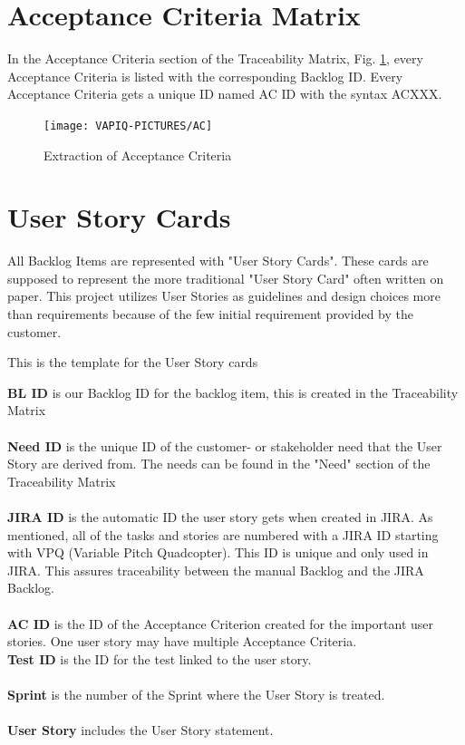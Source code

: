 \newpage

\section{Acceptance Criteria Matrix}
In the Acceptance Criteria section of the Traceability Matrix, Fig. \ref{fig:acm}, every Acceptance Criteria is listed with the corresponding Backlog ID. Every Acceptance Criteria gets a unique ID named AC ID with the syntax ACXXX. 
\begin{figure}[h]
    \centering
        \texttt{[image: VAPIQ-PICTURES/AC]}
    \caption{Extraction of Acceptance Criteria}
    \label{fig:acm}
\end{figure}

\newpage

\section{User Story Cards}
All Backlog Items are represented with "User Story Cards". These cards are supposed to represent the more traditional "User Story Card" often written on paper. This project utilizes User Stories as guidelines and design choices more than requirements because of the few initial requirement provided by the customer. \bigskip

This is the template for the User Story cards 

\krav{}{}{}{}{}{}{}


\textbf{BL ID} is our Backlog ID for the backlog item, this is created in the Traceability Matrix \\ \\
\textbf{Need ID} is the unique ID of the customer- or stakeholder need that the User Story are derived from. The needs can be found in the "Need" section of the Traceability Matrix \\ \\
\textbf{JIRA ID} is the automatic ID the user story gets when created in JIRA. As mentioned, all of the tasks and stories are numbered with a JIRA ID starting with VPQ (Variable Pitch Quadcopter). This ID is unique and only used in JIRA. This assures traceability between the manual Backlog and the JIRA Backlog. \\ \\
\textbf{AC ID} is the ID of the Acceptance Criterion created for the important user stories. One user story may have multiple Acceptance Criteria.  \\
\textbf{Test ID} is the ID for the test linked to the user story. \\ \\
\textbf{Sprint} is the number of the Sprint where the User Story is treated. \\ \\
\textbf{User Story} includes the User Story statement. \\
\\
